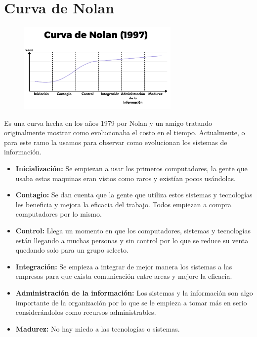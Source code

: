 \documentclass{templateNote}
\begin{document}
\section{Curva de Nolan}
\begin{figure}[H]
    \centering
    \includegraphics[width=0.7\textwidth]{img/CurvaDeNolan.png}
\end{figure}
\noindent Es una curva hecha en los años 1979 por Nolan y un amigo tratando originalmente mostrar como evolucionaba el costo en el tiempo. Actualmente, o para este ramo la usamos para observar como evolucionan los sistemas de información.    
\begin{itemize}
    \item \textbf{Inicialización:} Se empiezan a usar los primeros computadores, la gente que usaba estas maquinas eran vistos como raros y existían pocos usándolas.
    
    \item \textbf{Contagio:} Se dan cuenta que la gente que utiliza estos sistemas y tecnologías les beneficia y mejora la eficacia del trabajo. Todos empiezan a compra computadores por lo mismo.
    
    \item \textbf{Control:} Llega un momento en que los computadores, sistemas y tecnologías están llegando a muchas personas y sin control por lo que se reduce su venta quedando solo para un grupo selecto.
    
    \item \textbf{Integración:} Se empieza a integrar de mejor manera los sistemas a las empresas para que exista comunicación entre areas y mejore la eficacia.
    
    \item \textbf{Administración de la información:} Los sistemas y la información son algo importante de la organización por lo que se le empieza a tomar más en serio considerándolos como recursos administrables.
    
    \item \textbf{Madurez:} No hay miedo a las tecnologías o sistemas.
\end{itemize}
\end{document}
